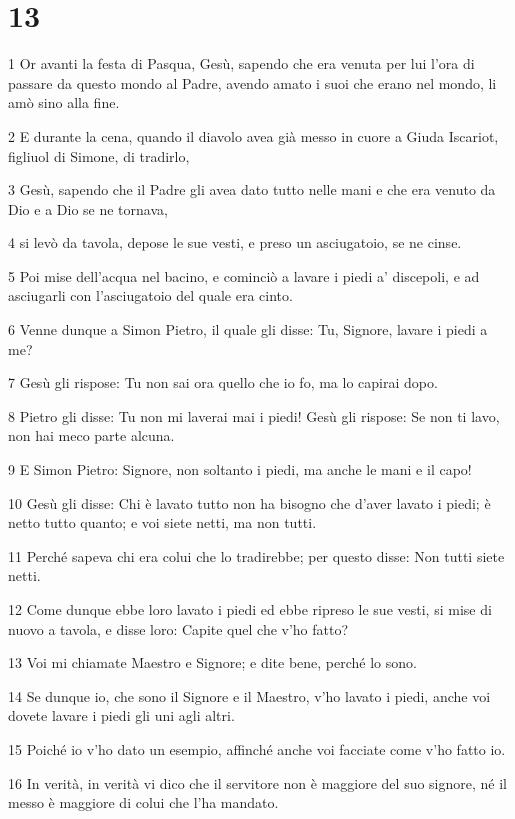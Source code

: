 \chapter{13}

\par 1 Or avanti la festa di Pasqua, Gesù, sapendo che era venuta per lui l'ora di passare da questo mondo al Padre, avendo amato i suoi che erano nel mondo, li amò sino alla fine.
\par 2 E durante la cena, quando il diavolo avea già messo in cuore a Giuda Iscariot, figliuol di Simone, di tradirlo,
\par 3 Gesù, sapendo che il Padre gli avea dato tutto nelle mani e che era venuto da Dio e a Dio se ne tornava,
\par 4 si levò da tavola, depose le sue vesti, e preso un asciugatoio, se ne cinse.
\par 5 Poi mise dell'acqua nel bacino, e cominciò a lavare i piedi a' discepoli, e ad asciugarli con l'asciugatoio del quale era cinto.
\par 6 Venne dunque a Simon Pietro, il quale gli disse: Tu, Signore, lavare i piedi a me?
\par 7 Gesù gli rispose: Tu non sai ora quello che io fo, ma lo capirai dopo.
\par 8 Pietro gli disse: Tu non mi laverai mai i piedi! Gesù gli rispose: Se non ti lavo, non hai meco parte alcuna.
\par 9 E Simon Pietro: Signore, non soltanto i piedi, ma anche le mani e il capo!
\par 10 Gesù gli disse: Chi è lavato tutto non ha bisogno che d'aver lavato i piedi; è netto tutto quanto; e voi siete netti, ma non tutti.
\par 11 Perché sapeva chi era colui che lo tradirebbe; per questo disse: Non tutti siete netti.
\par 12 Come dunque ebbe loro lavato i piedi ed ebbe ripreso le sue vesti, si mise di nuovo a tavola, e disse loro: Capite quel che v'ho fatto?
\par 13 Voi mi chiamate Maestro e Signore; e dite bene, perché lo sono.
\par 14 Se dunque io, che sono il Signore e il Maestro, v'ho lavato i piedi, anche voi dovete lavare i piedi gli uni agli altri.
\par 15 Poiché io v'ho dato un esempio, affinché anche voi facciate come v'ho fatto io.
\par 16 In verità, in verità vi dico che il servitore non è maggiore del suo signore, né il messo è maggiore di colui che l'ha mandato.
